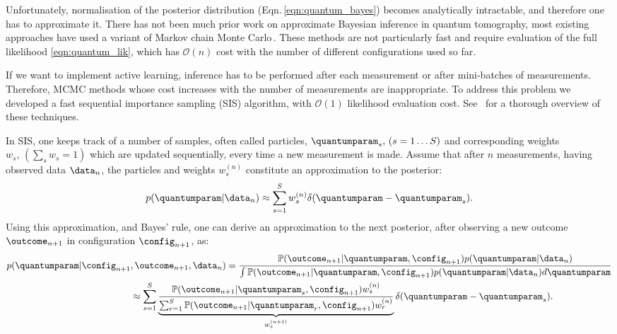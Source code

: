 Unfortunately, normalisation of the posterior distribution (Eqn.\,\eqref{eqn:quantum_bayes}) becomes analytically intractable, and therefore one has to approximate it. There has not been much prior work on approximate Bayesian inference in quantum tomography, most existing approaches have used a variant of Markov chain Monte Carlo\,\cite[MCMC,][and refs.\ therein]{BayesianTomography}. These methods are not particularly fast and require evaluation of the full likelihood \eqref{eqn:quantum_lik}, which has $\mathcal{O}(n)$ cost with the number of different configurations used so far.

If we want to implement active learning, inference has to be performed after each measurement or after mini-batches of measurements. Therefore, MCMC methods whose cost increases with the number of measurements are inappropriate. To address this problem we developed a fast sequential importance sampling (SIS) algorithm, with $\mathcal{O}(1)$ likelihood evaluation cost. See \,\citep{SMCBook} for a thorough overview of these techniques.

In SIS, one keeps track of a number of samples, often called particles, $\quantumparam_s,\, (s=1\ldots S)$ and corresponding weights $w_s, \, \left( \sum_s w_s = 1 \right)$  which are updated sequentially, every time a new measurement is made. Assume that after $n$ measurements, having observed data $\data_n$, the particles and weights  $w^{(n)}_s$ constitute an approximation to the posterior:	
%
\begin{equation}
	p(\quantumparam\vert\data_n)\approx \sum_{s=1}^{S}w^{(n)}_s\delta(\quantumparam-\quantumparam_s).\label{eqn:quantum_SISapprox}
\end{equation}
%
Using this approximation, and Bayes' rule, one can derive an approximation to the next posterior, after observing a new outcome $\outcome_{n+1}$ in configuration $\config_{n+1}$, as:
%
\begin{align}
	p(\quantumparam\vert\config_{n+1}&,\outcome_{n+1},\data_n) = \frac{\mathbb{P}(\outcome_{n+1}\vert\quantumparam,\config_{n+1})p(\quantumparam\vert\data_n)}{\int \mathbb{P}(\outcome_{n+1}\vert\quantumparam,\config_{n+1})p(\quantumparam\vert\data_n) d\quantumparam}\label{eqn:quantum_SISupdate}\\
	&\approx \sum_{s=1}^{S}\underbrace{\frac{\mathbb{P}(\outcome_{n+1}\vert\quantumparam_s,\config_{n+1})w^{(n)}_s}{\sum_{r=1}^{S}\mathbb{P}(\outcome_{n+1}\vert\quantumparam_r,\config_{n+1})w^{(n)}_r}}_{w^{(n+1)}_s}\delta(\quantumparam-\quantumparam_s).
\end{align}

